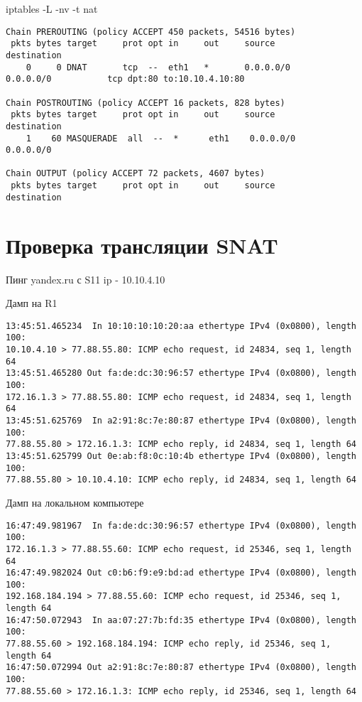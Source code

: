 \documentclass[a4paper,12pt]{article}
\begin{document}
iptables -L -nv -t nat
\begin{Verbatim}
Chain PREROUTING (policy ACCEPT 450 packets, 54516 bytes)
 pkts bytes target     prot opt in     out     source               destination         
    0     0 DNAT       tcp  --  eth1   *       0.0.0.0/0            0.0.0.0/0           tcp dpt:80 to:10.10.4.10:80 

Chain POSTROUTING (policy ACCEPT 16 packets, 828 bytes)
 pkts bytes target     prot opt in     out     source               destination         
    1    60 MASQUERADE  all  --  *      eth1    0.0.0.0/0            0.0.0.0/0           

Chain OUTPUT (policy ACCEPT 72 packets, 4607 bytes)
 pkts bytes target     prot opt in     out     source               destination
\end{Verbatim}

\section{Проверка трансляции SNAT}

Пинг yandex.ru с S11 ip - 10.10.4.10

Дамп на R1
\begin{Verbatim}
13:45:51.465234  In 10:10:10:10:20:aa ethertype IPv4 (0x0800), length 100: 
10.10.4.10 > 77.88.55.80: ICMP echo request, id 24834, seq 1, length 64
13:45:51.465280 Out fa:de:dc:30:96:57 ethertype IPv4 (0x0800), length 100: 
172.16.1.3 > 77.88.55.80: ICMP echo request, id 24834, seq 1, length 64
13:45:51.625769  In a2:91:8c:7e:80:87 ethertype IPv4 (0x0800), length 100: 
77.88.55.80 > 172.16.1.3: ICMP echo reply, id 24834, seq 1, length 64
13:45:51.625799 Out 0e:ab:f8:0c:10:4b ethertype IPv4 (0x0800), length 100: 
77.88.55.80 > 10.10.4.10: ICMP echo reply, id 24834, seq 1, length 64
\end{Verbatim}

Дамп на локальном компьютере
\begin{Verbatim}
16:47:49.981967  In fa:de:dc:30:96:57 ethertype IPv4 (0x0800), length 100: 
172.16.1.3 > 77.88.55.60: ICMP echo request, id 25346, seq 1, length 64
16:47:49.982024 Out c0:b6:f9:e9:bd:ad ethertype IPv4 (0x0800), length 100: 
192.168.184.194 > 77.88.55.60: ICMP echo request, id 25346, seq 1, length 64
16:47:50.072943  In aa:07:27:7b:fd:35 ethertype IPv4 (0x0800), length 100: 
77.88.55.60 > 192.168.184.194: ICMP echo reply, id 25346, seq 1, length 64
16:47:50.072994 Out a2:91:8c:7e:80:87 ethertype IPv4 (0x0800), length 100: 
77.88.55.60 > 172.16.1.3: ICMP echo reply, id 25346, seq 1, length 64

\end{Verbatim}
\end{document}
